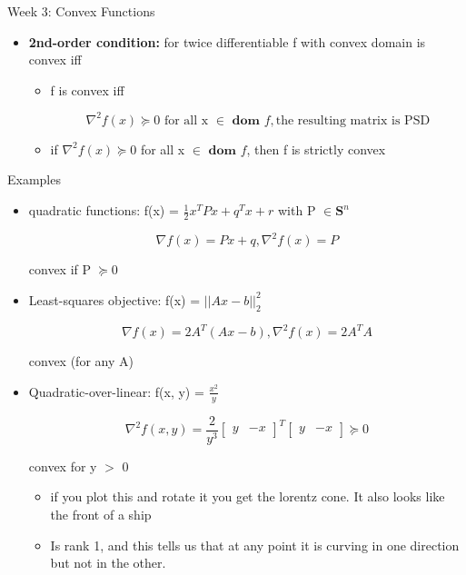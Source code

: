 \documentclass{article}
\begin{document}
\begin{homeworkProblemName}{{\LARGE Week 3: Convex Functions}}
\begin{problemAnswer}
{\begin{itemize}
      \item \textbf{2nd-order condition: } for twice differentiable f with convex domain
        is convex iff

        \begin{itemize}
        \item f is convex iff

          $$ \nabla^2 f(x) \succeq 0 \text{ for all x } \in \textbf{ dom } f, \text{the
            resulting matrix is PSD} $$

        \item if $ \nabla^2 f(x) \succeq 0$ for all x $\in \textbf{ dom } f $, then f is
          strictly convex
        \end{itemize}
      \end{itemize}
    }\end{problemAnswer}


  \begin{problemAnswer}{
    Examples

    \begin{itemize}
    \item quadratic functions: f(x) = $\frac{1}{2}x^TPx + q^Tx + r$ with P $\in
      \bm{S}^n$

      $$ \nabla f(x) = Px + q, \nabla^2 f(x) = P $$

      convex if P $\succeq$0

    \item Least-squares objective: f(x) = $|| Ax - b||_2^2$

      $$ \nabla f(x) = 2A^T(Ax - b), \nabla^2f(x) = 2A^TA $$

      convex (for any A)

    \item Quadratic-over-linear: f(x, y) = $\frac{x^2}{y}$

      $$ \nabla^2 f(x, y) = \frac{2}{y^3} \begin{bmatrix}y & -x\end{bmatrix}^T \begin{bmatrix}y & -x\end{bmatrix} \succeq 0$$

      convex for y $>$ 0

      \begin{itemize}
      \item if you plot this and rotate it you get the lorentz cone. It also looks
      like the front of a ship
      \item Is rank 1, and this tells us that at any point it is curving in one
      direction but not in the other.
      \end{itemize}


\end{itemize}}
\end{problemAnswer}
\end{homeworkProblemName}
\end{document}

